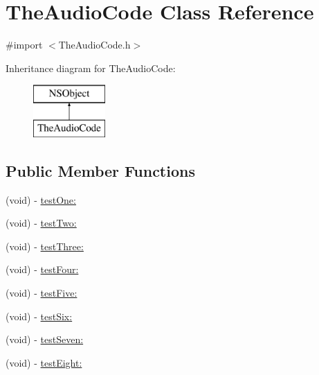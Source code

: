 \hypertarget{interface_the_audio_code}{\section{The\-Audio\-Code Class Reference}
\label{interface_the_audio_code}
}


{\ttfamily \#import $<$The\-Audio\-Code.\-h$>$}

Inheritance diagram for The\-Audio\-Code\-:\begin{figure}[H]
\begin{center}
\leavevmode
\includegraphics[height=2.000000cm]{interface_the_audio_code}
\end{center}
\end{figure}
\subsection*{Public Member Functions}
\begin{DoxyCompactItemize}
\item 
(void) -\/ \hyperlink{interface_the_audio_code_a7776a2aee37ac81afe6e98d3716d459b}{test\-One\-:}
\item 
(void) -\/ \hyperlink{interface_the_audio_code_ad05b778f31c78555a1f32b378668973f}{test\-Two\-:}
\item 
(void) -\/ \hyperlink{interface_the_audio_code_a2047f1d67aec2e858b9e3be1ca9a9f6c}{test\-Three\-:}
\item 
(void) -\/ \hyperlink{interface_the_audio_code_aba3efa564837f4cd8ca22d2ad0145663}{test\-Four\-:}
\item 
(void) -\/ \hyperlink{interface_the_audio_code_aba46046c6aa13363fd9c8c7d01135ab1}{test\-Five\-:}
\item 
(void) -\/ \hyperlink{interface_the_audio_code_a114504758ffbaf75a4e25ae37e83e679}{test\-Six\-:}
\item 
(void) -\/ \hyperlink{interface_the_audio_code_a8fc11e13ebd3259d3cd62303ac14076b}{test\-Seven\-:}
\item 
(void) -\/ \hyperlink{interface_the_audio_code_acd74afe261a0eb9b4ba4f618ea5a6aca}{test\-Eight\-:}
\end{DoxyCompactItemize}
